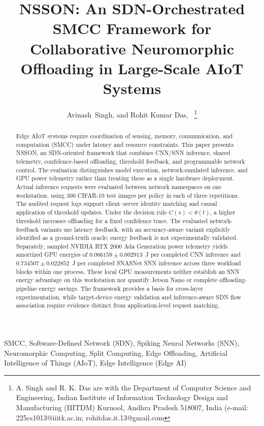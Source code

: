 \documentclass[journal]{IEEEtran}
\title{NSSON: An SDN-Orchestrated SMCC Framework for Collaborative Neuromorphic Offloading in Large-Scale AIoT Systems}
\author{Avinash~Singh, and Rohit Kumar Das,~\IEEEmembership{Senior Member,~IEEE,}
\thanks{A. Singh and R. K. Das are with the Department of Computer Science and Engineering, Indian Institute of Information Technology Design and Manufacturing (IIITDM) Kurnool, Andhra Pradesh 518007, India (e-mail: 225cs1013@iiitk.ac.in; rohitdas.it.13@gmail.com}%
}
\begin{document}
\maketitle

\begin{abstract}
Edge AIoT systems require coordination of sensing, memory,
communication, and computation (SMCC) under latency and resource
constraints. This paper presents NSSON, an SDN-oriented framework
that combines CNN/SNN inference, shared telemetry, confidence-based
offloading, threshold feedback, and programmable network control.
The evaluation distinguishes model execution, network-emulated
inference, and GPU power telemetry rather than treating these as
a single hardware deployment. Actual inference requests were
evaluated between network namespaces on one workstation, using
300 CIFAR-10 test images per policy in each of three repetitions.
The audited request logs support client--server identity matching
and causal application of threshold updates. Under the decision
rule $C(s)<\theta(t)$, a higher threshold increases offloading for
a fixed confidence trace. The evaluated network-feedback variants
use latency feedback, with an accuracy-aware variant explicitly
identified as a ground-truth oracle; energy feedback is not
experimentally validated. Separately, sampled NVIDIA RTX 2000 Ada
Generation power telemetry yields amortized GPU energies of
$0.066159 \pm 0.002913$~J per completed CNN inference and
$0.734507 \pm 0.022852$~J per completed SNASNet SNN inference
across three workload blocks within one process. These local
GPU measurements neither establish an SNN energy advantage on
this workstation nor quantify Jetson Nano or complete
offloading-pipeline energy savings. The framework provides a
basis for cross-layer experimentation, while target-device
energy validation and inference-aware SDN flow association
require evidence distinct from application-level request matching.
\end{abstract}

\begin{IEEEkeywords}
SMCC, Software-Defined Network (SDN), Spiking Neural Networks (SNN), Neuromorphic
Computing, Split Computing, Edge Offloading, Artificial Intelligence of Things (AIoT), Edge Intelligence (Edge AI)
\end{IEEEkeywords}

\end{document}
